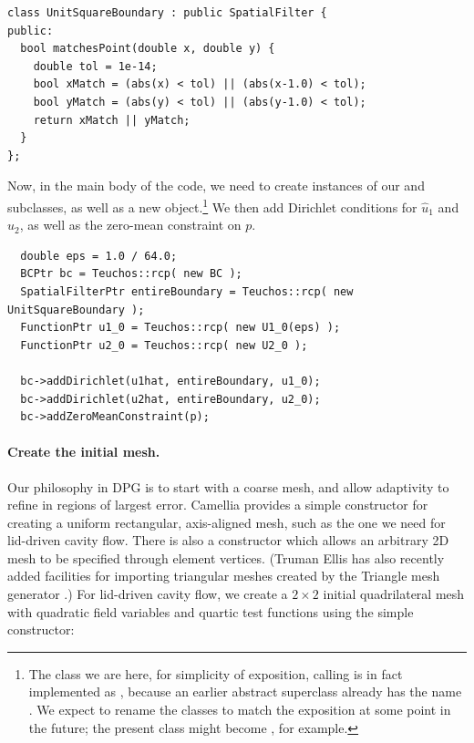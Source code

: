 \begin{lstlisting}
class UnitSquareBoundary : public SpatialFilter {
public:
  bool matchesPoint(double x, double y) {
    double tol = 1e-14;
    bool xMatch = (abs(x) < tol) || (abs(x-1.0) < tol);
    bool yMatch = (abs(y) < tol) || (abs(y-1.0) < tol);
    return xMatch || yMatch;
  }
};
\end{lstlisting}

Now, in the main body of the code, we need to create instances of our  and  subclasses, as well as a new  object.\footnote{The class we are here, for simplicity of exposition, calling  is in fact implemented as , because an earlier abstract superclass already has the name .  We expect to rename the classes to match the exposition at some point in the future; the present  class might become , for example.}  We then add Dirichlet conditions for $\widehat{u}_{1}$ and $\widehat{u}_{2}$, as well as the zero-mean constraint on $p$.

\begin{lstlisting}
  double eps = 1.0 / 64.0;
  BCPtr bc = Teuchos::rcp( new BC );
  SpatialFilterPtr entireBoundary = Teuchos::rcp( new UnitSquareBoundary );
  FunctionPtr u1_0 = Teuchos::rcp( new U1_0(eps) );
  FunctionPtr u2_0 = Teuchos::rcp( new U2_0 );
    
  bc->addDirichlet(u1hat, entireBoundary, u1_0);
  bc->addDirichlet(u2hat, entireBoundary, u2_0);
  bc->addZeroMeanConstraint(p);
\end{lstlisting}

\paragraph{Create the initial mesh.}
Our philosophy in DPG is to start with a coarse mesh, and allow adaptivity to refine in regions of largest error.  Camellia provides a simple constructor for creating a uniform rectangular, axis-aligned mesh, such as the one we need for lid-driven cavity flow.  There is also a constructor which allows an arbitrary 2D mesh to be specified through element vertices.  (Truman Ellis has also recently added facilities for importing triangular meshes created by the Triangle mesh generator \cite{shewchuk96b}.)  For lid-driven cavity flow, we create a $2 \times 2$ initial quadrilateral mesh with quadratic field variables and quartic test functions using the simple constructor:

